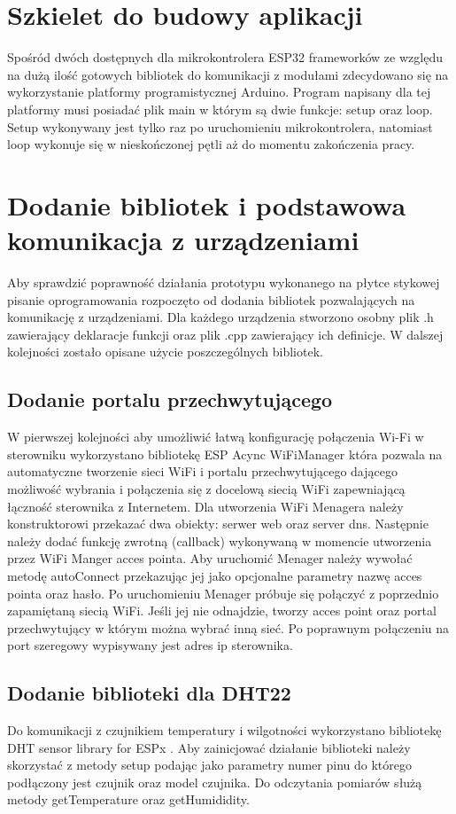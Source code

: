 \documentclass[11pt]{report}
\begin{document}
 \section{Szkielet do budowy aplikacji}
 Spośród dwóch dostępnych dla mikrokontrolera ESP32 frameworków ze względu na dużą ilość gotowych bibliotek do komunikacji z modułami zdecydowano się na wykorzystanie platformy programistycznej Arduino.
 Program napisany dla tej platformy musi posiadać plik main w którym są dwie funkcje: setup oraz loop.
 Setup wykonywany jest tylko raz po uruchomieniu mikrokontrolera, natomiast loop wykonuje się w nieskończonej pętli aż do momentu zakończenia pracy.
 
 \section{Dodanie bibliotek i podstawowa komunikacja z urządzeniami}
 Aby sprawdzić poprawność działania prototypu wykonanego na płytce stykowej pisanie oprogramowania rozpoczęto od dodania bibliotek pozwalających na komunikację z urządzeniami. Dla każdego urządzenia stworzono osobny plik .h zawierający deklaracje funkcji oraz plik .cpp zawierający ich definicje.
 W dalszej kolejności zostało opisane użycie poszczególnych bibliotek.
  \subsection{Dodanie portalu przechwytującego}
 W pierwszej kolejności aby umożliwić łatwą konfigurację połączenia Wi-Fi w sterowniku wykorzystano bibliotekę ESP Acync WiFiManager \cite{WiFiManager} która pozwala na automatyczne tworzenie sieci WiFi i portalu przechwytującego dającego możliwość wybrania i połączenia się z docelową siecią WiFi zapewniającą łączność sterownika z Internetem. 
 Dla utworzenia  WiFi Menagera należy konstruktorowi przekazać dwa obiekty: serwer web oraz server dns. Następnie należy dodać funkcję zwrotną (callback) wykonywaną w momencie utworzenia przez WiFi Manger acces pointa. Aby uruchomić Menager należy wywołać metodę autoConnect przekazując jej jako opcjonalne parametry nazwę acces pointa oraz hasło. Po uruchomieniu Menager próbuje się połączyć z poprzednio zapamiętaną siecią WiFi. Jeśli jej nie odnajdzie, tworzy acces point oraz portal przechwytujący w którym można wybrać inną sieć. Po poprawnym połączeniu na port szeregowy wypisywany jest adres ip sterownika.
 \subsection{Dodanie biblioteki dla DHT22}
 Do komunikacji z czujnikiem temperatury i wilgotności wykorzystano bibliotekę DHT sensor library for ESPx \cite{DHTlibrary}. Aby zainicjować działanie biblioteki należy skorzystać z metody setup podając jako parametry numer pinu do którego podłączony jest czujnik oraz model czujnika. Do odczytania pomiarów służą metody getTemperature oraz getHumididity.
\end{document}
